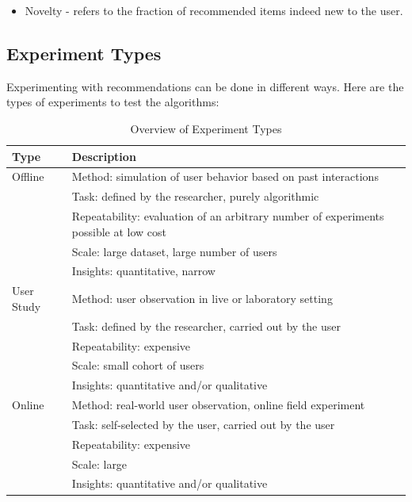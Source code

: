 \documentclass[\myFontSize,oneside,english,hidelinks,a4paper]{article}
\begin{document}
\begin{itemize}
\item Novelty - refers to the fraction of recommended items indeed new to the user.\\

\end{itemize}
%
%
\subsection{Experiment Types}
Experimenting with recommendations can be done in different ways. Here are the types of experiments to test the algorithms:
{
\renewcommand{\arraystretch}{1.5}
\begin{table}[h!]
\centering
\begin{tabular}{p{3cm}|p{10cm}}
\hline
\textbf{Type} & \textbf{Description} \\
\hline
Offline & Method: simulation of user behavior based on past interactions \\
        & Task: defined by the researcher, purely algorithmic \\
        & Repeatability: evaluation of an arbitrary number of experiments possible at low cost \\
        & Scale: large dataset, large number of users \\
        & Insights: quantitative, narrow \\
\hline
User Study & Method: user observation in live or laboratory setting \\
           & Task: defined by the researcher, carried out by the user \\
           & Repeatability: expensive \\
           & Scale: small cohort of users \\
           & Insights: quantitative and/or qualitative \\
\hline
Online & Method: real-world user observation, online field experiment \\
       & Task: self-selected by the user, carried out by the user \\
       & Repeatability: expensive \\
       & Scale: large \\
       & Insights: quantitative and/or qualitative \\
\hline
\end{tabular}

\caption{Overview of Experiment Types \cite{Zangerle2023}}
\end{table}\\
}
\end{document}
